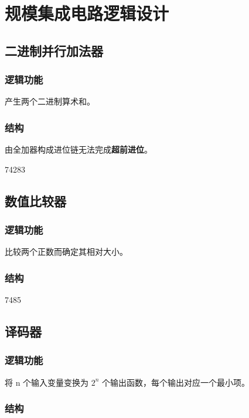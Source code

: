\chapter{规模集成电路逻辑设计}
\newpage

\section{二进制并行加法器}

\subsection{逻辑功能}

产生两个二进制算术和。

\subsection{结构}

由全加器构成进位链无法完成\textbf{超前进位}。

74283

\newpage
\section{数值比较器}

\subsection{逻辑功能}

比较两个正数而确定其相对大小。

\subsection{结构}

7485

\newpage
\section{译码器}

\subsection{逻辑功能}

将 n 个输入变量变换为 $2^n$ 个输出函数，每个输出对应一个最小项。

\subsection{结构}

